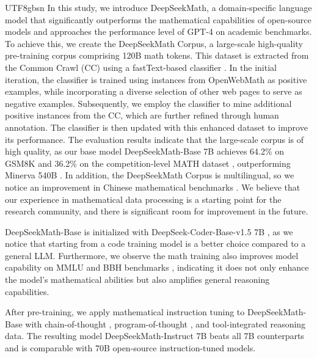 \documentclass[11pt, a4paper, logo, copyright, nonumbering]{deepseek}
\newcommand{\spmath}{DeepSeekMath}
\begin{document}
\begin{CJK*}{UTF8}{gbsn}
In this study, we introduce \spmath, a domain-specific language model that significantly outperforms the mathematical capabilities of open-source models and approaches the performance level of GPT-4 on academic benchmarks.
To achieve this, we create the DeepSeekMath Corpus, a large-scale high-quality pre-training corpus comprising 120B math tokens.
This dataset is extracted from the Common Crawl (CC) using a fastText-based classifier \citep{joulin2016fasttext}. In the initial iteration, the classifier is trained using instances from OpenWebMath \citep{openwebmath} as positive examples, while incorporating a diverse selection of other web pages to serve as negative examples. Subsequently, we employ the classifier to mine additional positive instances from the CC, which are further refined through human annotation. The classifier is then updated with this enhanced dataset to improve its performance. The evaluation results indicate that the large-scale corpus is of high quality, as our base model \spmath-Base 7B achieves 64.2\% on GSM8K \citep{gsm8k} and 36.2\% on the competition-level MATH dataset \citep{MATH}, outperforming Minerva 540B \citep{minerva}. In addition, the DeepSeekMath Corpus is multilingual, so we notice an improvement in Chinese mathematical benchmarks \citep{wei2023cmath,agieval}.
We believe that our experience in mathematical data processing is a starting point for the research community, and there is significant room for improvement in the future.

\spmath-Base is initialized with DeepSeek-Coder-Base-v1.5 7B \citep{deepseek-coder}, as we notice that starting from a code training model is a better choice compared to a general LLM. Furthermore, we observe the math training also improves model capability on MMLU \citep{mmlu} and BBH benchmarks \citep{bbh}, indicating it does not only enhance the model's mathematical abilities but also amplifies general reasoning capabilities.

After pre-training, we apply mathematical instruction tuning to \spmath-Base with chain-of-thought \citep{cot}, program-of-thought \citep{pot,pal}, and tool-integrated reasoning \citep{tora} data.
The resulting model \spmath-Instruct 7B beats all 7B counterparts and is comparable with 70B open-source instruction-tuned models.  


\end{CJK*}
\end{document}
